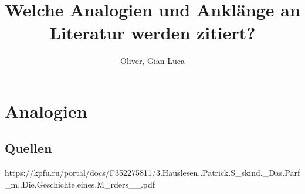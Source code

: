 \documentclass[11pt]{article}
\author{Oliver, Gian Luca}
\title{Welche Analogien und Anklänge an Literatur werden zitiert?}
\begin{document}
    \maketitle
    \section{Analogien}





    \subsection{Quellen}
    https://kpfu.ru/portal/docs/F352275811/3.Hauslesen..Patrick.S_skind._Das.Parf_m..Die.Geschichte.eines.M_rders__.pdf
\end{document}
